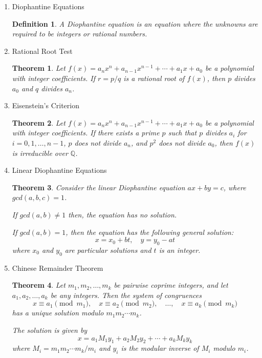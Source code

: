 \documentclass{article}
\newtheorem{definition}{Definition}[section]
\newtheorem{theorem}{Theorem}[section]
\begin{document}
\begin{enumerate}
        \item Diophantine Equations
        \begin{definition}
            A Diophantine equation is an equation where the unknowns are required to be integers or rational numbers.
        \end{definition}
        \item Rational Root Test
        \begin{theorem}
            Let $f(x) = a_n x^n + a_{n-1} x^{n-1} + \cdots + a_1 x + a_0$ be a polynomial with integer coefficients. If $r = p/q$ is a rational root of $f(x)$, then $p$ divides $a_0$ and $q$ divides $a_n$.
        \end{theorem}
        \item Eisenstein's Criterion
        \begin{theorem}
            Let $f(x) = a_n x^n + a_{n-1} x^{n-1} + \cdots + a_1 x + a_0$ be a polynomial with integer coefficients. If there exists a prime $p$ such that $p$ divides $a_i$ for $i = 0, 1, \ldots, n-1$, $p$ does not divide $a_n$, and $p^2$ does not divide $a_0$, then $f(x)$ is irreducible over $\mathbb{Q}$.
        \end{theorem}
        \item Linear Diophantine Equations
        \begin{theorem}
            Consider the linear Diophantine equation $ax + by = c$,
            where $gcd(a,b,c) = 1$.

            If $gcd(a,b) \neq 1$ then, the equation has no solution.

            If $gcd(a,b) = 1$, then the equation has the following general solution:
            \begin{equation}
                x = x_0 + bt, \quad y = y_0 - at
            \end{equation}
            where $x_0$ and $y_0$ are particular solutions and $t$ is an integer.
        \end{theorem}
        \item Chinese Remainder Theorem
        \begin{theorem}
            Let $m_1, m_2, \ldots, m_k$ be pairwise coprime integers, and let $a_1, a_2, \ldots, a_k$ be any integers. Then the system of congruences
            \begin{equation}
                x \equiv a_1 \pmod{m_1}, \quad x \equiv a_2 \pmod{m_2}, \quad \ldots, \quad x \equiv a_k \pmod{m_k}
            \end{equation}
            has a unique solution modulo $m_1 m_2 \cdots m_k$.

            The solution is given by
            \begin{equation}
                x = a_1 M_1 y_1 + a_2 M_2 y_2 + \cdots + a_k M_k y_k
            \end{equation}
            where $M_i = m_1 m_2 \cdots m_k / m_i$ and $y_i$ is the modular inverse of $M_i$ modulo $m_i$.
        \end{theorem}
    \end{enumerate}
\end{document}
